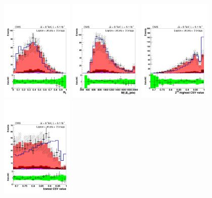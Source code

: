 \begin{figure}[hbtp]
 \begin{center}
   \includegraphics[width=0.31\textwidth]{Figures/Analysis_1_Diagrams/d2MCPlots_h3_cut6_jge6_t3_Combined_HtWgt.pdf}
   \includegraphics[width=0.31\textwidth]{Figures/Analysis_1_Diagrams/d2MCPlots_dijet_mass_of_everything_cut6_jge6_t3_Combined_HtWgt.pdf}
   \includegraphics[width=0.31\textwidth]{Figures/Analysis_1_Diagrams/d2MCPlots_second_highest_btag_cut6_jge6_t3_Combined_HtWgt.pdf}
   \includegraphics[width=0.31\textwidth]{Figures/Analysis_1_Diagrams/d2MCPlots_lowest_btag_cut6_jge6_t3_Combined_HtWgt.pdf}

\end{center}
\end{figure}
